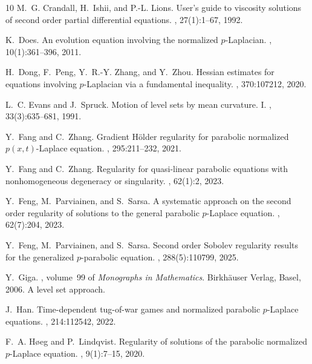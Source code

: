 \documentclass[a4paper,11pt]{amsart}
\theoremstyle{plain}
\theoremstyle{definition}
\numberwithin{equation}{section}
\begin{document}
\begin{thebibliography}{10}
	M.~G. Crandall, H.~Ishii, and P.-L. Lions.
	\newblock User's guide to viscosity solutions of second order partial
	differential equations.
	, 27(1):1--67, 1992.
	
	K.~Does.
	\newblock An evolution equation involving the normalized {$p$}-{L}aplacian.
	, 10(1):361--396, 2011.
	
	H.~Dong, F.~Peng, Y.~R.-Y. Zhang, and Y.~Zhou.
	\newblock Hessian estimates for equations involving {$p$}-{L}aplacian via a
	fundamental inequality.
	, 370:107212, 2020.
	
	L.~C. Evans and J.~Spruck.
	\newblock Motion of level sets by mean curvature. {I}.
	, 33(3):635--681, 1991.
	
	Y.~Fang and C.~Zhang.
	\newblock Gradient {H}\"{o}lder regularity for parabolic normalized
	{$p(x,t)$}-{L}aplace equation.
	, 295:211--232, 2021.
	
	Y.~Fang and C.~Zhang.
	\newblock Regularity for quasi-linear parabolic equations with nonhomogeneous
	degeneracy or singularity.
	, 62(1):2, 2023.
	
	Y.~Feng, M.~Parviainen, and S.~Sarsa.
	\newblock A systematic approach on the second order regularity of solutions to
	the general parabolic {$p$}-{L}aplace equation.
	, 62(7):204, 2023.
	
	Y.~Feng, M.~Parviainen, and S.~Sarsa.
	\newblock Second order {S}obolev regularity results for the generalized
	{$p$}-parabolic equation.
	, 288(5):110799, 2025.
	
	Y.~Giga.
	, volume~99 of {\em Monographs in
		Mathematics}.
	\newblock Birkh\"auser Verlag, Basel, 2006.
	\newblock A level set approach.
	
	J.~Han.
	\newblock Time-dependent tug-of-war games and normalized parabolic
	{$p$}-{L}aplace equations.
	, 214:112542, 2022.
	
	F.~A. H{\o}eg and P.~Lindqvist.
	\newblock Regularity of solutions of the parabolic normalized {$p$}-{L}aplace
	equation.
	, 9(1):7--15, 2020.
	

\end{thebibliography}
\end{document}
